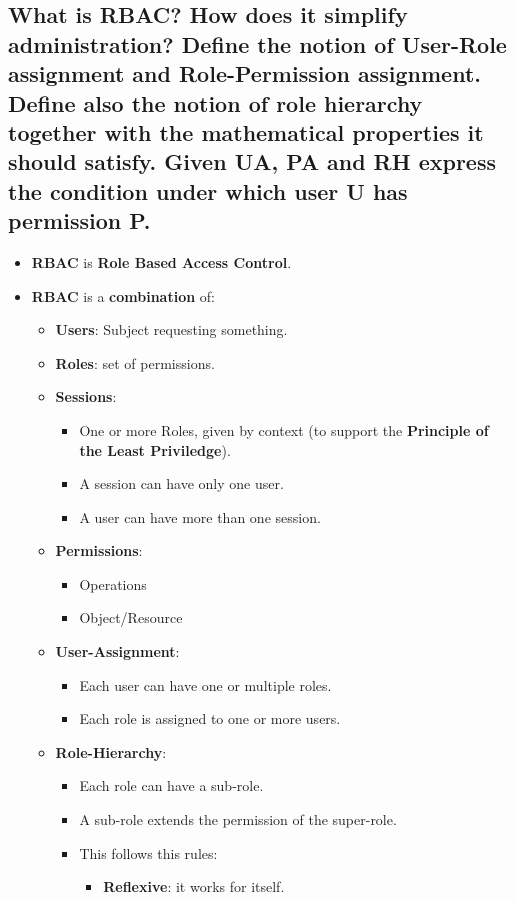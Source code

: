 \documentclass[9pt, letterpaper]{article}
\begin{document}
\subsection{What is RBAC? How does it simplify administration? Define the notion of User-Role assignment and Role-Permission assignment. Define also the notion of role hierarchy together with the mathematical properties it should satisfy. Given UA, PA and RH express the condition under which user U has permission P.}
\begin{itemize}
	\item \textbf{RBAC} is \textbf{Role Based Access Control}.
	\item \textbf{RBAC} is a \textbf{combination} of:
	\begin{itemize}
		\item \textbf{Users}: Subject requesting something.
		\item \textbf{Roles}: set of permissions.
		\item \textbf{Sessions}: 
		\begin{itemize}
			\item One or more Roles, given by context (to support the \textbf{Principle of the Least Priviledge}).
			\item A session can have only one user. 
			\item A user can have more than one session.
		\end{itemize}
		\item \textbf{Permissions}:
		\begin{itemize}
			\item Operations
			\item Object/Resource
		\end{itemize}
		\item \textbf{User-Assignment}:
		\begin{itemize}
			\item Each user can have one or multiple roles.
			\item Each role is assigned to one or more users.
		\end{itemize}
		\item \textbf{Role-Hierarchy}:
		\begin{itemize}
			\item Each role can have a sub-role.
			\item A sub-role extends the permission of the super-role.
			\item This follows this rules:
			\begin{itemize}
				\item \textbf{Reflexive}: it works for itself.

\end{itemize}
\end{itemize}
\end{itemize}
\end{itemize}
\end{document}
